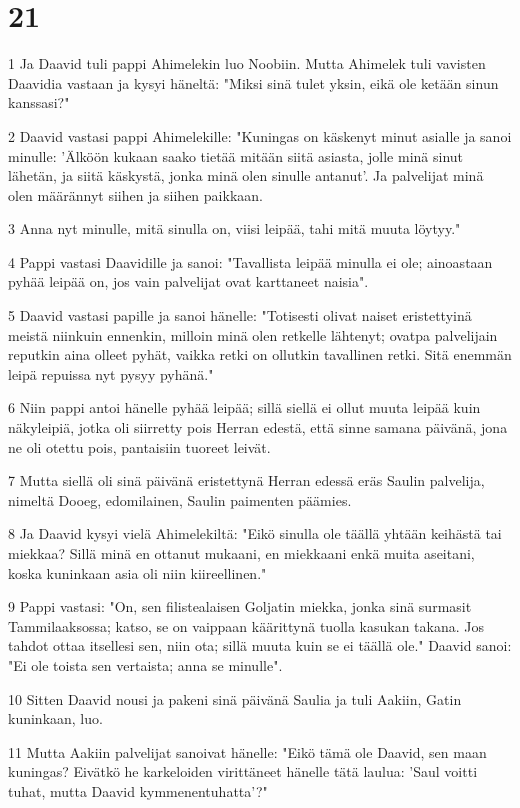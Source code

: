 \chapter{21}

\par 1 Ja Daavid tuli pappi Ahimelekin luo Noobiin. Mutta Ahimelek tuli vavisten Daavidia vastaan ja kysyi häneltä: "Miksi sinä tulet yksin, eikä ole ketään sinun kanssasi?"
\par 2 Daavid vastasi pappi Ahimelekille: "Kuningas on käskenyt minut asialle ja sanoi minulle: 'Älköön kukaan saako tietää mitään siitä asiasta, jolle minä sinut lähetän, ja siitä käskystä, jonka minä olen sinulle antanut'. Ja palvelijat minä olen määrännyt siihen ja siihen paikkaan.
\par 3 Anna nyt minulle, mitä sinulla on, viisi leipää, tahi mitä muuta löytyy."
\par 4 Pappi vastasi Daavidille ja sanoi: "Tavallista leipää minulla ei ole; ainoastaan pyhää leipää on, jos vain palvelijat ovat karttaneet naisia".
\par 5 Daavid vastasi papille ja sanoi hänelle: "Totisesti olivat naiset eristettyinä meistä niinkuin ennenkin, milloin minä olen retkelle lähtenyt; ovatpa palvelijain reputkin aina olleet pyhät, vaikka retki on ollutkin tavallinen retki. Sitä enemmän leipä repuissa nyt pysyy pyhänä."
\par 6 Niin pappi antoi hänelle pyhää leipää; sillä siellä ei ollut muuta leipää kuin näkyleipiä, jotka oli siirretty pois Herran edestä, että sinne samana päivänä, jona ne oli otettu pois, pantaisiin tuoreet leivät.
\par 7 Mutta siellä oli sinä päivänä eristettynä Herran edessä eräs Saulin palvelija, nimeltä Dooeg, edomilainen, Saulin paimenten päämies.
\par 8 Ja Daavid kysyi vielä Ahimelekiltä: "Eikö sinulla ole täällä yhtään keihästä tai miekkaa? Sillä minä en ottanut mukaani, en miekkaani enkä muita aseitani, koska kuninkaan asia oli niin kiireellinen."
\par 9 Pappi vastasi: "On, sen filistealaisen Goljatin miekka, jonka sinä surmasit Tammilaaksossa; katso, se on vaippaan käärittynä tuolla kasukan takana. Jos tahdot ottaa itsellesi sen, niin ota; sillä muuta kuin se ei täällä ole." Daavid sanoi: "Ei ole toista sen vertaista; anna se minulle".
\par 10 Sitten Daavid nousi ja pakeni sinä päivänä Saulia ja tuli Aakiin, Gatin kuninkaan, luo.
\par 11 Mutta Aakiin palvelijat sanoivat hänelle: "Eikö tämä ole Daavid, sen maan kuningas? Eivätkö he karkeloiden virittäneet hänelle tätä laulua: 'Saul voitti tuhat, mutta Daavid kymmenentuhatta'?"
